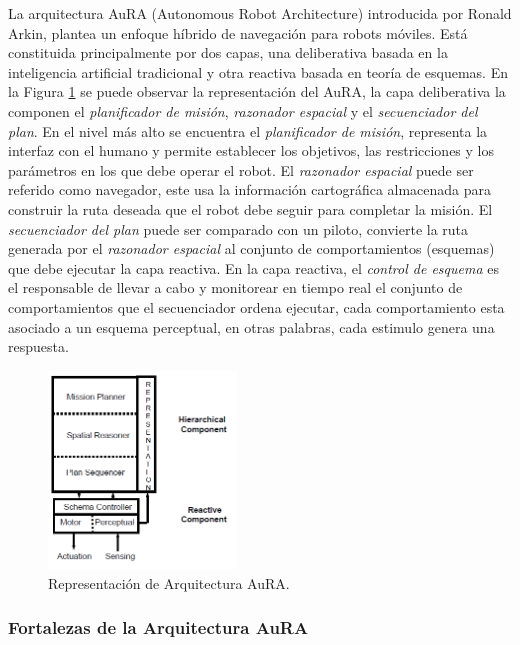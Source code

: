 \documentclass[11pt,twoside,A5]{article}
\newcommand{\reffigure}[1]{Figura \ref{#1}}
\begin{document}
La arquitectura AuRA \cite{arkin1997} (Autonomous Robot Architecture) introducida por Ronald Arkin, plantea un enfoque híbrido
de navegación para robots móviles. Está constituida principalmente por dos capas, una deliberativa basada en la inteligencia artificial
tradicional y otra reactiva basada en teoría de esquemas. En la \reffigure{fig:aura} se puede observar la representación del AuRA, 
la capa deliberativa la componen el \textit{planificador de misión}, \textit{razonador espacial} y el \textit{secuenciador del plan}. En el nivel más alto se encuentra el \textit{planificador de misión}, representa la interfaz con el humano y permite establecer los objetivos, 
las restricciones y los parámetros en los que debe operar el robot. El \textit{razonador espacial} puede ser referido como navegador, este usa la información cartográfica
almacenada para construir la ruta deseada que el robot debe seguir para completar la misión. El \textit{secuenciador del plan}
puede ser comparado con un piloto, convierte la ruta generada por el \textit{razonador espacial} al conjunto de comportamientos (esquemas) que debe ejecutar la capa reactiva. En la capa reactiva, el \textit{control de esquema} es el responsable de llevar a cabo y monitorear en tiempo real el conjunto de comportamientos que el secuenciador ordena ejecutar, cada comportamiento esta asociado a un esquema perceptual, en otras palabras, cada estimulo genera una respuesta. 

\begin{figure}[here]
\begin{center}
\includegraphics[width=5cm]{aura.png} 
\caption{Representación de Arquitectura AuRA.}
\label{fig:aura}
\end{center}
\end{figure} 

\subsubsection*{Fortalezas de la Arquitectura AuRA}
\end{document}
